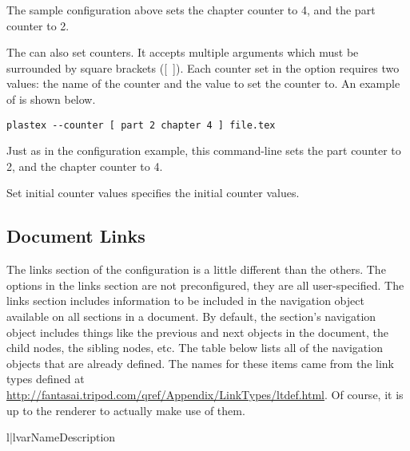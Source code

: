 The sample configuration above sets the chapter counter to 4, and the
part counter to 2.

The  can also set counters.  It accepts multiple
arguments which must be surrounded by square brackets ([~]).
Each counter set in the 
option requires two values: the name of the counter and the value to
set the counter to.  An example of  is shown below.
\begin{verbatim}
plastex --counter [ part 2 chapter 4 ] file.tex
\end{verbatim}

Just as in the configuration example, this command-line sets the
part counter to 2, and the chapter counter to 4.

\begin{configuration}{Set initial counter values}
specifies the initial counter values.
\end{configuration}


\subsection{Document Links\label{sec:config-links}}

The links section of the configuration is a little different than the
others.  The options in the links section are not preconfigured, they
are all user-specified.  The links section includes information 
to be included in the navigation object available on all sections in 
a document.  By default, the section's navigation object includes things
like the previous and next objects in the document, the child nodes, 
the sibling nodes, etc.  The table below lists all of the navigation
objects that are already defined.  The names for these items came from
the link types defined at \url{http://fantasai.tripod.com/qref/Appendix/LinkTypes/ltdef.html}.  Of course, it is up to the renderer to actually make use
of them.

\begin{tableii}{l|l}{var}{Name}{Description}
\end{tableii}

